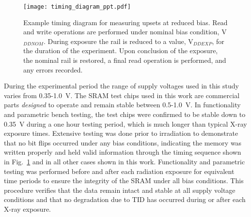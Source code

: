 \begin{figure}[tb]
    \centering
        \texttt{[image: timing\_diagram\_ppt.pdf]}
        \caption{Example timing diagram for measuring upsets at reduced bias. Read and write operations are performed under nominal bias condition, V$_{DDNOM}$. During exposure the rail is reduced to a value, V$_{DDEXP}$, for the duration of the experiment. Upon conclusion of the exposure, the nominal rail is restored, a final read operation is performed, and any errors recorded.}
        \label{fig:exp_timing_diagram}
\end{figure}

During the experimental period the range of supply voltages used in this study varies from 0.35-1.0~V. 
The SRAM test chips used in this work are commercial parts \emph{designed} to operate and remain stable between 0.5-1.0~V.
In functionality and parametric bench testing, the test chips were confirmed to be stable down to 0.35~V during a one hour testing period, which is much longer than typical X-ray exposure times.
Extensive testing was done prior to irradiation to demonstrate that no bit flips occurred under any bias conditions, indicating the memory was written properly and held valid information through the timing sequence shown in Fig.~\ref{fig:exp_timing_diagram} and in all other cases shown in this work. 
Functionality and parametric testing was performed before and after each radiation exposure for equivalent time periods to ensure the integrity of the SRAM under all bias conditions. 
This procedure verifies that the data remain intact and stable at all supply voltage conditions and that no degradation due to TID has occurred during or after each X-ray exposure.

